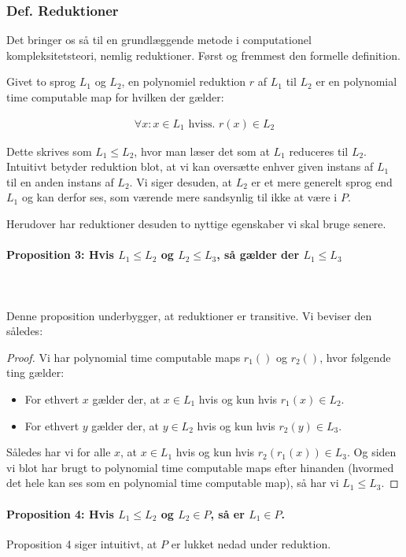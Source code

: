 \subsubsection{Def. Reduktioner}

Det bringer os så til en grundlæggende metode i computationel
kompleksitetsteori, nemlig reduktioner. Først og fremmest den formelle
definition.

Givet to sprog $L_1$ og $L_2$, en polynomiel reduktion $r$ af $L_1$ til $L_2$ er
en polynomial time computable map for hvilken der gælder:

\begin{align*}
 \forall x : x \in L_1 \text{ hviss. } r(x) \in L_2
\end{align*}

Dette skrives som $L_1 \leq L_2$, hvor man læser det som at $L_1$ reduceres
til $L_2$. Intuitivt betyder reduktion blot, at vi kan oversætte enhver given
instans af $L_1$ til en anden instans af $L_2$. Vi siger desuden, at $L_2$ er et
mere generelt sprog end $L_1$ og kan derfor ses, som værende mere sandsynlig
til ikke at være i $P$.


Herudover har reduktioner desuden to nyttige egenskaber vi skal bruge senere.

\paragraph{Proposition 3: Hvis $L_1 \leq L_2$ og $L_2 \leq L_3$, så gælder der
$L_1 \leq L_3$}
~\\
~\\
Denne proposition underbygger, at reduktioner er transitive. Vi beviser den
således:

\begin{proof}
 Vi har polynomial time computable maps $r_1()$ og $r_2()$, hvor følgende ting
gælder:

\begin{itemize}
 \item For ethvert $x$ gælder der, at $x \in L_1$ hvis og kun hvis $r_1(x) \in
L_2$.
 \item For ethvert $y$ gælder der, at $y \in L_2$ hvis og kun hvis $r_2(y) \in
L_3$.
\end{itemize}

Således har vi for alle $x$, at $x \in L_1$ hvis og kun hvis $r_2(r_1(x))
\in L_3$. Og siden vi blot har brugt to polynomial time computable maps efter
hinanden (hvormed det hele kan ses som en polynomial time computable map), så
har vi $L_1 \leq L_3$.
\end{proof}

\paragraph{Proposition 4: Hvis $L_1 \leq L_2$ og $L_2 \in P$, så er $L_1 \in P$.}

Proposition 4 siger intuitivt, at $P$ er lukket nedad under reduktion. 

